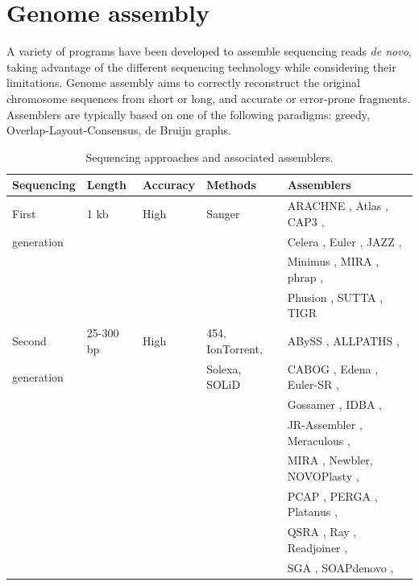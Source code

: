 \section{Genome assembly}

A variety of programs have been developed to assemble sequencing reads \textit{de novo}, taking advantage of the different sequencing technology while considering their limitations. Genome assembly aims to correctly reconstruct the original chromosome sequences from short or long, and accurate or error-prone fragments. Assemblers are typically based on one of the following paradigms: greedy, Overlap-Layout-Consensus, de Bruijn graphs. \\

\begin{table}
\caption{Sequencing approaches and associated assemblers.}
\centering
\begin{tabular}{|l|l|l|l|l|}
    \hline
    \textbf{Sequencing} & \textbf{Length} & \textbf{Accuracy} & \textbf{Methods} & \textbf{Assemblers}\\
    \hline
    First & 1 kb & High & Sanger & ARACHNE \cite{arachne}, Atlas \cite{atlas}, CAP3 \cite{cap3}, \\
    generation &  &  &  & Celera \cite{celera}, Euler \cite{euler}, JAZZ \cite{jazz},  \\
        &  &  &  & Minimus \cite{minimus}, MIRA \cite{mira}, phrap \cite{phrap}, \\
        &  &  &  & Phusion \cite{phusion}, SUTTA \cite{sutta}, TIGR \cite{tigr} \\
    \hline
    Second & 25-300 bp & High & 454, IonTorrent, & ABySS \cite{abyss,abyss2}, ALLPATHS \cite{allpaths}, \\
    generation &  &  & Solexa, SOLiD & CABOG \cite{cabog}, Edena \cite{edena}, Euler-SR \cite{euler-sr}, \\
        &  &  &  & Gossamer \cite{gossamer}, IDBA \cite{idba}, \\
        &  &  &  & JR-Assembler \cite{jr-assembler}, Meraculous \cite{meraculous}, \\
        &  &  &  & MIRA \cite{mira}, Newbler, NOVOPlasty \cite{novoplasty},  \\ 
        &  &  &  & PCAP \cite{pcap}, PERGA \cite{perga}, Platanus \cite{platanus},  \\
        &  &  &  & QSRA \cite{qsra}, Ray \cite{ray}, Readjoiner \cite{readjoiner}, \\
        &  &  &  & SGA \cite{sga}, SOAPdenovo \cite{soapdenovo}, \\

\end{tabular}
\end{table}
